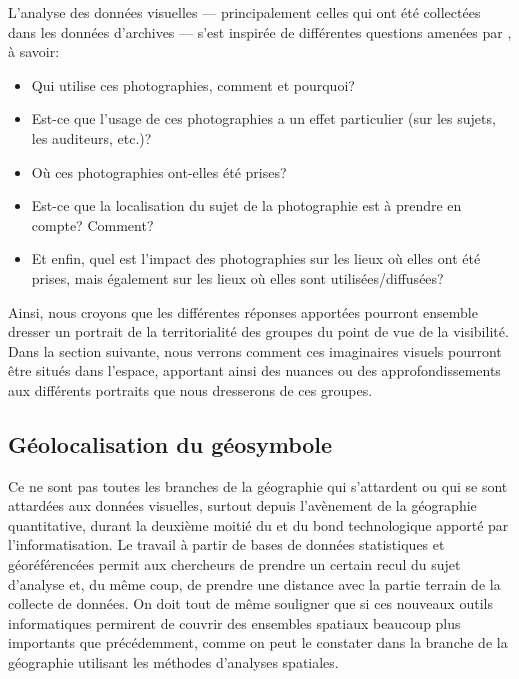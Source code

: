 

L'analyse des données visuelles --- principalement celles qui ont été collectées dans les données d'archives --- s'est inspirée de différentes questions amenées par \citet[157]{Rose2008}, à savoir:
\begin{itemize}
 \item Qui utilise ces photographies, comment et pourquoi?
 \item Est-ce que l'usage de ces photographies a un effet particulier (sur les sujets, les auditeurs, etc.)?
 \item Où ces photographies ont-elles été prises?
 \item Est-ce que la localisation du sujet de la photographie est à prendre en compte? Comment?
 \item Et enfin, quel est l'impact des photographies sur les lieux où elles ont été prises, mais également sur les lieux où elles sont utilisées/diffusées?
\end{itemize}

Ainsi, nous croyons que les différentes réponses apportées pourront ensemble dresser un portrait de la territorialité des groupes \lgbt{} du point de vue de la visibilité.
Dans la section suivante, nous verrons comment ces imaginaires visuels pourront être situés dans l'espace, apportant ainsi des nuances ou des approfondissements aux différents portraits que nous dresserons de ces groupes.

\subsection{Géolocalisation du géosymbole}
\label{sub:g_olocalisation_du_sybole}
Ce ne sont pas toutes les branches de la géographie qui s'attardent ou qui se sont attardées aux données visuelles, surtout depuis l'avènement de la géographie quantitative, durant la deuxième moitié du  et du bond technologique apporté par l'informatisation.
Le travail à partir de bases de données statistiques et géoréférencées permit aux chercheurs de prendre un certain recul du sujet d'analyse et, du même coup, de prendre une distance avec la partie terrain de la collecte de données.
On doit tout de même souligner que si ces nouveaux outils informatiques permirent de couvrir des ensembles spatiaux beaucoup plus importants que précédemment, comme on peut le constater dans la branche de la géographie utilisant les méthodes d'analyses spatiales.

